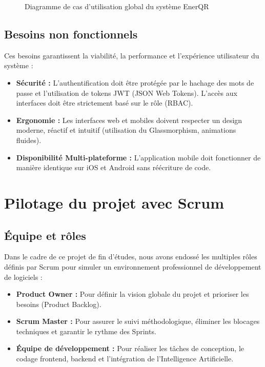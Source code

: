 \documentclass[12pt,a4paper]{report}
\begin{document}
\begin{figure}[H]
    \centering
    \vspace{5cm} %
    \caption{Diagramme de cas d'utilisation global du système EnerQR}
    \label{fig:usecase}
\end{figure}

\subsection{Besoins non fonctionnels}
Ces besoins garantissent la viabilité, la performance et l'expérience utilisateur du système :
\begin{itemize}
    \item \textbf{Sécurité :} L'authentification doit être protégée par le hachage des mots de passe et l'utilisation de tokens JWT (JSON Web Tokens). L'accès aux interfaces doit être strictement basé sur le rôle (RBAC).
    \item \textbf{Ergonomie :} Les interfaces web et mobiles doivent respecter un design moderne, réactif et intuitif (utilisation du Glassmorphism, animations fluides).
    \item \textbf{Disponibilité Multi-plateforme :} L'application mobile doit fonctionner de manière identique sur iOS et Android sans réécriture de code.
\end{itemize}

\section{Pilotage du projet avec Scrum}
\subsection{Équipe et rôles}
Dans le cadre de ce projet de fin d'études, nous avons endossé les multiples rôles définis par Scrum pour simuler un environnement professionnel de développement de logiciels :
\begin{itemize}
    \item \textbf{Product Owner :} Pour définir la vision globale du projet et prioriser les besoins (Product Backlog).
    \item \textbf{Scrum Master :} Pour assurer le suivi méthodologique, éliminer les blocages techniques et garantir le rythme des Sprints.
    \item \textbf{Équipe de développement :} Pour réaliser les tâches de conception, le codage frontend, backend et l'intégration de l'Intelligence Artificielle.
\end{itemize}
\end{document}
